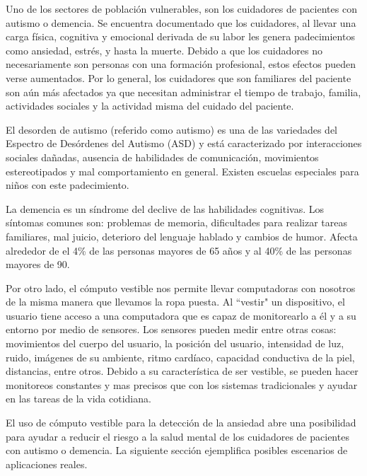 \documentclass[letterpaper,12pt]{cicese}
\begin{document}
			Uno de los sectores de poblaci\'on vulnerables, son los cuidadores de pacientes con autismo o demencia. Se encuentra documentado que los cuidadores, al llevar una carga f\'isica, cognitiva y emocional derivada de su labor les genera padecimientos como ansiedad, estr\'es, y hasta la muerte\citep{Chen2013}. Debido a que los cuidadores no necesariamente son personas con una formaci\'on profesional, estos efectos pueden verse aumentados. Por lo general, los cuidadores que son familiares del paciente son a\'un m\'as afectados ya que necesitan administrar el tiempo de trabajo, familia, actividades sociales y la actividad misma del cuidado del paciente.

			El desorden de autismo (referido como autismo) es una de las variedades del Espectro de Des\'ordenes del Autismo (ASD) y est\'a caracterizado por interacciones sociales da\~nadas, ausencia de habilidades de comunicaci\'on, movimientos estereotipados y mal comportamiento en general\citep{bernier2010autism}. Existen escuelas especiales para ni\~nos con este padecimiento. 

La demencia es un s\'indrome del declive de las habilidades cognitivas. Los s\'intomas comunes son: problemas de memoria, dificultades para realizar tareas familiares, mal juicio, deterioro del lenguaje hablado y cambios de humor\citep{Aziz}. Afecta alrededor de el 4\% de las personas mayores de 65 a\~nos y al 40\% de las personas mayores de 90. 

			Por otro lado, el c\'omputo vestible nos permite llevar computadoras con nosotros de la misma manera que llevamos la ropa puesta. Al ``vestir" un dispositivo,
			el usuario tiene acceso a una computadora que es capaz de monitorearlo a \'el y a su entorno por medio de sensores. Los sensores pueden medir entre
			otras cosas: movimientos del cuerpo del usuario, la posici\'on del usuario, intensidad de luz, ruido, im\'agenes de su ambiente, ritmo card\'iaco, capacidad
			conductiva de la piel, distancias, entre otros. Debido a su caracter\'istica de ser vestible, se pueden hacer monitoreos constantes y mas precisos que con
			los sistemas tradicionales y ayudar en las tareas de la vida cotidiana.
	
			El uso de c\'omputo vestible para la detecci\'on de la ansiedad abre una posibilidad para ayudar a reducir el riesgo a la salud mental
			de los cuidadores de pacientes con autismo o demencia. La siguiente secci\'on ejemplifica posibles escenarios de aplicaciones reales.
\end{document}
